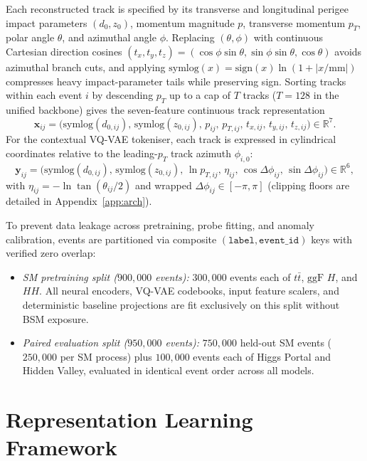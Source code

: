 \documentclass{article}
\begin{document}
Each reconstructed track is specified by its transverse and longitudinal perigee impact parameters $(d_0, z_0)$, momentum magnitude $p$, transverse momentum $p_T$, polar angle $\theta$, and azimuthal angle $\phi$. Replacing $(\theta, \phi)$ with continuous Cartesian direction cosines $(t_x, t_y, t_z) = (\cos\phi\sin\theta, \sin\phi\sin\theta, \cos\theta)$ avoids azimuthal branch cuts, and applying $\text{symlog}(x) = \text{sign}(x)\ln(1 + |x/\text{mm}|)$ compresses heavy impact-parameter tails while preserving sign. Sorting tracks within each event $i$ by descending $p_T$ up to a cap of $T$ tracks ($T = 128$ in the unified backbone) gives the seven-feature continuous track representation
\begin{equation}
    \mathbf{x}_{ij} = \big(\text{symlog}(d_{0,ij}),\, \text{symlog}(z_{0,ij}),\, p_{ij},\, p_{T,ij},\, t_{x,ij},\, t_{y,ij},\, t_{z,ij}\big) \in \mathbb{R}^7 .
    \label{eq:track_vec7}
\end{equation}
For the contextual VQ-VAE tokeniser, each track is expressed in cylindrical coordinates relative to the leading-$p_T$ track azimuth $\phi_{i,0}$:
\begin{equation}
    \mathbf{y}_{ij} = \big(\text{symlog}(d_{0,ij}),\, \text{symlog}(z_{0,ij}),\, \ln p_{T,ij},\, \eta_{ij},\, \cos\Delta\phi_{ij},\, \sin\Delta\phi_{ij}\big) \in \mathbb{R}^6 ,
    \label{eq:track_vq6}
\end{equation}
with $\eta_{ij} = -\ln\tan(\theta_{ij}/2)$ and wrapped $\Delta\phi_{ij} \in [-\pi, \pi]$ (clipping floors are detailed in Appendix~\ref{app:arch}).

To prevent data leakage across pretraining, probe fitting, and anomaly calibration, events are partitioned via composite $(\texttt{label}, \texttt{event\_id})$ keys with verified zero overlap:
\begin{itemize}
    \item \emph{SM pretraining split ($900,000$ events):} $300,000$ events each of $t\bar{t}$, $\text{ggF } H$, and $HH$. All neural encoders, VQ-VAE codebooks, input feature scalers, and deterministic baseline projections are fit exclusively on this split without BSM exposure.
    \item \emph{Paired evaluation split ($950,000$ events):} $750,000$ held-out SM events ($250,000$ per SM process) plus $100,000$ events each of Higgs Portal and Hidden Valley, evaluated in identical event order across all models.
\end{itemize}

\section{Representation Learning Framework}
\label{sec:rep_learn}
\end{document}
